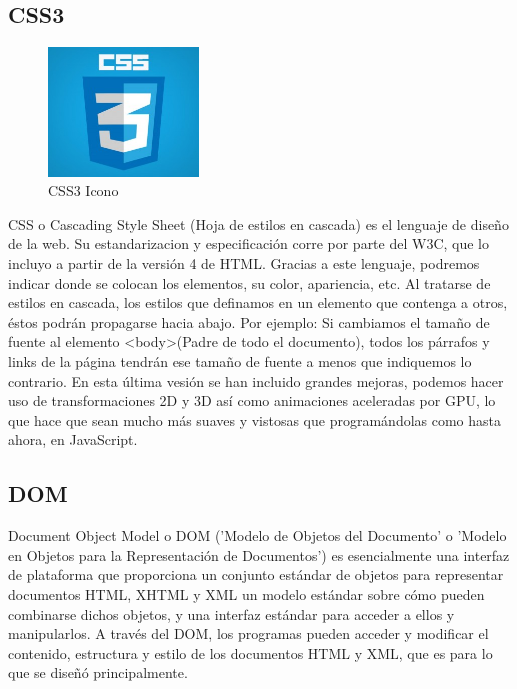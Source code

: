 \subsection{CSS3}
\begin{figure}[!h]
    \centering
    \includegraphics[width=40mm]{img/introduccion/css.jpg}
    \caption{CSS3 Icono}
\end{figure}
CSS o Cascading Style Sheet (Hoja de estilos en cascada) es el lenguaje de diseño de la web.
Su estandarizacion y especificación corre por parte del W3C, que lo incluyo a partir de la versión 4 de HTML.
Gracias a este lenguaje, podremos indicar donde se colocan los elementos, su color, apariencia, etc.
Al tratarse de estilos en cascada, los estilos que definamos en un elemento que contenga a otros, éstos podrán propagarse hacia abajo. Por ejemplo: Si cambiamos el tamaño de fuente al elemento <body>(Padre de todo el documento), todos los párrafos y links de la página tendrán ese tamaño de fuente a menos que indiquemos lo contrario.
En esta última vesión se han incluido grandes mejoras, podemos hacer uso de transformaciones 2D y 3D así como animaciones aceleradas por GPU, lo que hace que sean mucho más suaves y vistosas que programándolas como hasta ahora, en JavaScript.
\subsection{DOM}
Document Object Model o DOM ('Modelo de Objetos del Documento' o 'Modelo en Objetos para la Representación de Documentos') es esencialmente una interfaz de plataforma que proporciona un conjunto estándar de objetos para representar documentos HTML, XHTML y XML un modelo estándar sobre cómo pueden combinarse dichos objetos, y una interfaz estándar para acceder a ellos y manipularlos. A través del DOM, los programas pueden acceder y modificar el contenido, estructura y estilo de los documentos HTML y XML, que es para lo que se diseñó principalmente.

